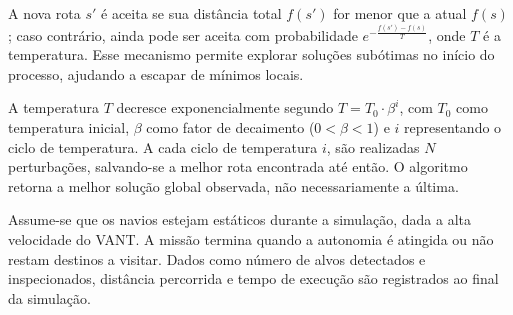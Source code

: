 A nova rota $s'$ é aceita se sua distância total $f(s')$ for menor que a atual $f(s)$; caso contrário, ainda pode ser aceita com probabilidade $e^{-\frac{f(s') - f(s)}{T}}$, onde $T$ é a temperatura. Esse mecanismo permite explorar soluções subótimas no início do processo, ajudando a escapar de mínimos locais.

A temperatura $T$ decresce exponencialmente segundo $T = T_0 \cdot \beta^i$, com $T_0$ como temperatura inicial, $\beta$ como fator de decaimento ($0 < \beta < 1$) e $i$ representando o ciclo de temperatura. A cada ciclo de temperatura $i$, são realizadas $N$ perturbações, salvando-se a melhor rota encontrada até então. O algoritmo retorna a melhor solução global observada, não necessariamente a última.

Assume-se que os navios estejam estáticos durante a simulação, dada a alta velocidade do VANT. A missão termina quando a autonomia é atingida ou não restam destinos a visitar. Dados como número de alvos detectados e inspecionados, distância percorrida e tempo de execução são registrados ao final da simulação.


